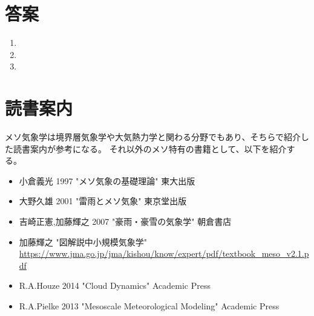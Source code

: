 \documentclass{jsarticle}
\newenvironment{problems}
{
  \renewcommand\labelenumi{\doublebox{\arabic{enumi}}}
  \begin{enumerate}
}{
  \end{enumerate}
  \renewcommand\labelenumi{\arabic{enumi}.}
}
\begin{document}
\section{答案}
\begin{problems}
\item 

\item 

\item 

\end{problems}

\section{読書案内}
メソ気象学は境界層気象学や大気熱力学と関わる分野でもあり、そちらで紹介した読書案内が参考になる。
それ以外のメソ特有の書籍として、以下を紹介する。

\begin{itemize}
\item 小倉義光 1997 "メソ気象の基礎理論" 東大出版
\item 大野久雄 2001 "雷雨とメソ気象" 東京堂出版
\item 吉崎正憲,加藤輝之 2007 "豪雨・豪雪の気象学" 朝倉書店
\item 加藤輝之 "図解説中小規模気象学" \url{https://www.jma.go.jp/jma/kishou/know/expert/pdf/textbook_meso_v2.1.pdf}
\item R.A.Houze 2014 "Cloud Dynamics" Academic Press
\item R.A.Pielke 2013 "Mesoscale Meteorological Modeling" Academic Press
\end{itemize}
\end{document}
